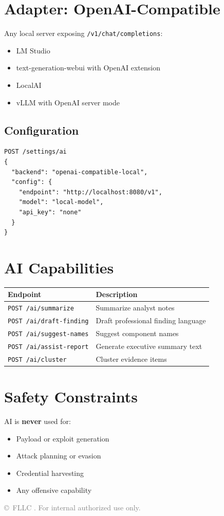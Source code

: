 \documentclass[11pt,a4paper]{article}
\begin{document}
\section{Adapter: OpenAI-Compatible}
Any local server exposing \texttt{/v1/chat/completions}:
\begin{itemize}
  \item LM Studio
  \item text-generation-webui with OpenAI extension
  \item LocalAI
  \item vLLM with OpenAI server mode
\end{itemize}

\subsection{Configuration}
\begin{lstlisting}
POST /settings/ai
{
  "backend": "openai-compatible-local",
  "config": {
    "endpoint": "http://localhost:8080/v1",
    "model": "local-model",
    "api_key": "none"
  }
}
\end{lstlisting}

\section{AI Capabilities}
\begin{tabular}{lp{9cm}}
\toprule
\textbf{Endpoint} & \textbf{Description} \\
\midrule
\texttt{POST /ai/summarize}      & Summarize analyst notes \\
\texttt{POST /ai/draft-finding}  & Draft professional finding language \\
\texttt{POST /ai/suggest-names}  & Suggest component names \\
\texttt{POST /ai/assist-report}  & Generate executive summary text \\
\texttt{POST /ai/cluster}        & Cluster evidence items \\
\bottomrule
\end{tabular}

\section{Safety Constraints}
AI is \textbf{never} used for:
\begin{itemize}
  \item Payload or exploit generation
  \item Attack planning or evasion
  \item Credential harvesting
  \item Any offensive capability
\end{itemize}

\vfill
\begin{center}
\textcolor{gray}{\small\copyright\ FLLC \the\year.  For internal authorized use only.}
\end{center}
\end{document}
